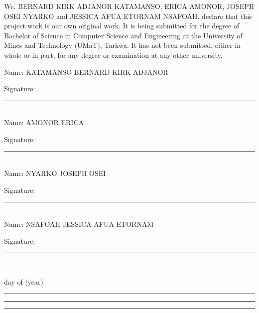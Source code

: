 \documentclass[12pt, onehalfspacing, liststotoc, oneside, parskip, headsepline,UKenglish]{UMaT_Undergrauate_Report_Template_Configurations}
\begin{document}
\vspace{-20pt}
\begin{declaration}
  \addchaptertocentry{\authorshipname}

  We, BERNARD KIRK ADJANOR KATAMANSO, ERICA AMONOR, JOSEPH OSEI NYARKO and JESSICA AFUA ETORNAM NSAFOAH, declare that this project work is our own original work. It is being submitted for the degree of Bachelor of Science in Computer Science and Engineering at the University of Mines and Technology (UMaT), Tarkwa. It has not been submitted, either in whole or in part, for any degree or examination at any other university.\vspace{20pt}

  Name: \qquad KATAMANSO BERNARD KIRK ADJANOR \vspace{-0.2pt}

  \noindent Signature: \rule{7cm}{0.8pt}\\

  Name: \qquad AMONOR ERICA\vspace{-0.2pt}

  \noindent Signature: \rule{7cm}{0.8pt}\\

  Name: \qquad  NYARKO JOSEPH OSEI \vspace{-0.2pt}

  \noindent Signature: \rule{7cm}{0.8pt}\\

  Name: \qquad NSAFOAH JESSICA AFUA ETORNAM \vspace{-0.2pt}

  \noindent Signature: \rule{7cm}{0.8pt}\\

  \vspace{0.8cm}

  \hspace{5.3em} day of\vspace{-10pt} \hspace{9em} (year)\vspace{-5pt}

  \noindent \rule[0.5em]{5em}{0.5pt} \hspace{3.5em} \rule[0.5em]{8em}{0.5pt} \hspace{3.2em} \rule[0.5em]{5em}{0.5pt}
\end{declaration}
\end{document}
